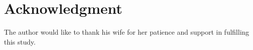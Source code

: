 \documentclass[conference]{IEEEtran}
\begin{document}

\section*{Acknowledgment}

The author would like to thank his wife for her patience and support in fulfilling this study. 

\ifCLASSOPTIONcaptionsoff
  \newpage
\fi





%
%
%





% 
\end{document}
